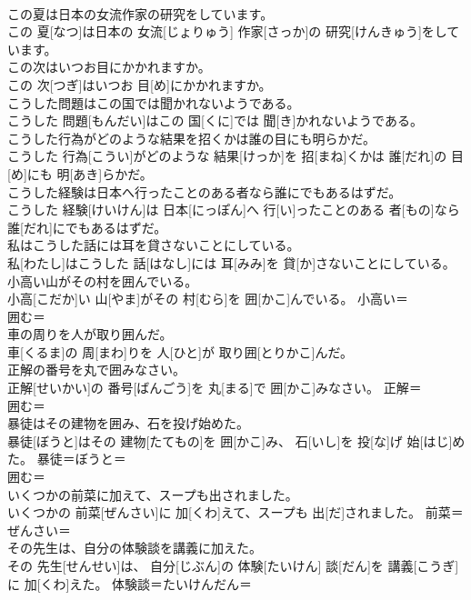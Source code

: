 \documentclass[8pt]{extreport}
\begin{document}
\begin{CJK}{UTF8}{min}
\\	この夏は日本の女流作家の研究をしています。	
\\	この 夏[なつ]は日本の 女流[じょりゅう] 作家[さっか]の 研究[けんきゅう]をしています。	
\\	この次はいつお目にかかれますか。	
\\	この 次[つぎ]はいつお 目[め]にかかれますか。	
\\	こうした問題はこの国では聞かれないようである。	
\\	こうした 問題[もんだい]はこの 国[くに]では 聞[き]かれないようである。	
\\	こうした行為がどのような結果を招くかは誰の目にも明らかだ。	
\\	こうした 行為[こうい]がどのような 結果[けっか]を 招[まね]くかは 誰[だれ]の 目[め]にも 明[あき]らかだ。	
\\	こうした経験は日本へ行ったことのある者なら誰にでもあるはずだ。	
\\	こうした 経験[けいけん]は 日本[にっぽん]へ 行[い]ったことのある 者[もの]なら 誰[だれ]にでもあるはずだ。	
\\	私はこうした話には耳を貸さないことにしている。	
\\	私[わたし]はこうした 話[はなし]には 耳[みみ]を 貸[か]さないことにしている。	
\\	小高い山がその村を囲んでいる。	
\\	小高[こだか]い 山[やま]がその 村[むら]を 囲[かこ]んでいる。	小高い＝ 
\\	囲む＝ 
\\	車の周りを人が取り囲んだ。	
\\	車[くるま]の 周[まわ]りを 人[ひと]が 取り囲[とりかこ]んだ。	
\\	正解の番号を丸で囲みなさい。	
\\	正解[せいかい]の 番号[ばんごう]を 丸[まる]で 囲[かこ]みなさい。	正解＝ 
\\	囲む＝ 
\\	暴徒はその建物を囲み、石を投げ始めた。	
\\	暴徒[ぼうと]はその 建物[たてもの]を 囲[かこ]み、 石[いし]を 投[な]げ 始[はじ]めた。	暴徒＝ぼうと＝ 
\\	囲む＝ 
\\	いくつかの前菜に加えて、スープも出されました。	
\\	いくつかの 前菜[ぜんさい]に 加[くわ]えて、スープも 出[だ]されました。	前菜＝ぜんさい＝ 
\\	その先生は、自分の体験談を講義に加えた。	
\\	その 先生[せんせい]は、 自分[じぶん]の 体験[たいけん] 談[だん]を 講義[こうぎ]に 加[くわ]えた。	体験談＝たいけんだん＝ 

\end{CJK}
\end{document}
